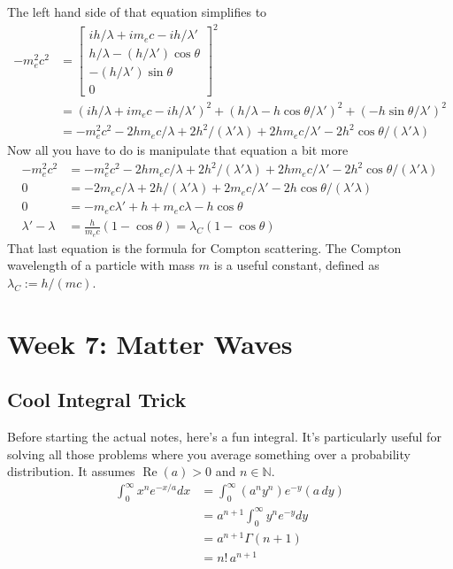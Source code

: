 \documentclass[12pt]{article}
\begin{document}
The left hand side of that equation simplifies to
\begin{align*}
    - m_e^2 c^2 &= \begin{bmatrix} i h / \lambda + i m_e c - i h / \lambda' \\ h / \lambda - (h / \lambda') \cos \theta \\ - (h / \lambda') \sin \theta \\ 0 \end{bmatrix}^2 \\
                &= (ih/\lambda + im_ec - ih/\lambda')^2 + (h/\lambda - h\cos \theta / \lambda')^2 + (-h \sin \theta / \lambda')^2 \\
                &= - m_e^2c^2 - 2hm_ec/\lambda + 2h^2/(\lambda' \lambda) + 2hm_ec/\lambda' - 2h^2\cos \theta / (\lambda' \lambda)
\end{align*}
Now all you have to do is manipulate that equation a bit more
\begin{align*}
    - m_e^2 c^2 &= - m_e^2c^2 - 2hm_ec/\lambda + 2h^2/(\lambda' \lambda) + 2hm_ec/\lambda' - 2h^2\cos \theta / (\lambda' \lambda) \\
    0 &= - 2m_ec/\lambda + 2h/(\lambda' \lambda) + 2m_ec/\lambda' - 2h\cos \theta / (\lambda' \lambda) \\
    0 &= -m_ec\lambda' + h + m_ec\lambda - h\cos \theta \\
    \lambda' - \lambda &= \frac{h}{m_e c} (1 - \cos \theta) = \lambda_C (1 - \cos \theta)
\end{align*}
That last equation is the formula for Compton scattering. The Compton wavelength of a particle with mass $m$ is a useful constant, defined as $\lambda_C := h/(m c)$.

\section{Week 7: Matter Waves}

\subsection{Cool Integral Trick}
Before starting the actual notes, here's a fun integral. It's particularly useful for solving all those problems where you average something over a probability distribution. It assumes $\operatorname{Re}(a)>0$ and $n \in \mathbb{N}$.
\begin{align*}
    \int_0^\infty x^n e^{-x/a} dx &= \int_0^\infty (a^n y^n) e^{-y} (a \, dy) \\
    &= a^{n+1} \int_0^\infty y^n e^{-y} dy \\
    &= a^{n+1} \Gamma(n+1) \\
    &= n! \, a^{n+1}
\end{align*}
\end{document}
